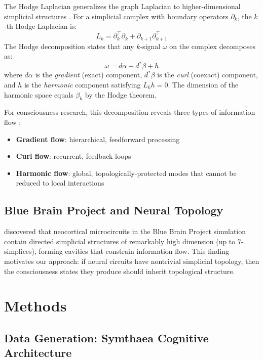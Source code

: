 \documentclass[11pt,a4paper]{article}
\begin{document}
The Hodge Laplacian generalizes the graph Laplacian to higher-dimensional simplicial structures \citep{lim2020hodge, barbarossa2020topological}.
For a simplicial complex with boundary operators $\partial_k$, the $k$-th Hodge Laplacian is:
\[
L_k = \partial_k^\top \partial_k + \partial_{k+1} \partial_{k+1}^\top
\]
The Hodge decomposition states that any $k$-signal $\omega$ on the complex decomposes as:
\[
\omega = d\alpha + d^*\beta + h
\]
where $d\alpha$ is the \emph{gradient} (exact) component, $d^*\beta$ is the \emph{curl} (coexact) component, and $h$ is the \emph{harmonic} component satisfying $L_k h = 0$.
The dimension of the harmonic space equals $\beta_k$ by the Hodge theorem.

For consciousness research, this decomposition reveals three types of information flow \citep{reimann2017cliques, schaub2021signal}:
\begin{itemize}
  \item \textbf{Gradient flow}: hierarchical, feedforward processing
  \item \textbf{Curl flow}: recurrent, feedback loops
  \item \textbf{Harmonic flow}: global, topologically-protected modes that cannot be reduced to local interactions
\end{itemize}

\subsection{Blue Brain Project and Neural Topology}

\citet{reimann2017cliques} discovered that neocortical microcircuits in the Blue Brain Project simulation contain directed simplicial structures of remarkably high dimension (up to 7-simplices), forming cavities that constrain information flow.
This finding motivates our approach: if neural circuits have nontrivial simplicial topology, then the consciousness states they produce should inherit topological structure.

\section{Methods}
\label{sec:methods}

\subsection{Data Generation: Symthaea Cognitive Architecture}
\end{document}
